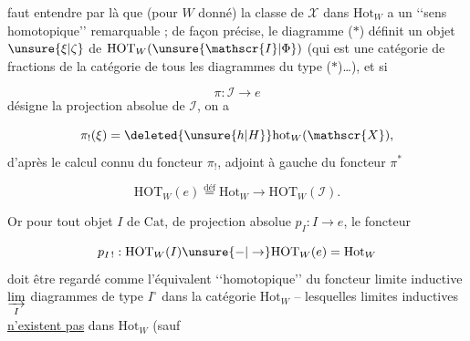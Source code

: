  faut entendre par là que (pour $W$  donné) la classe  de $\mathscr{X}$ dans $\mathrm{Hot}_W$ a un \lq\lq sens homotopique\rq\rq{} remarquable  ; de façon précise, le diagramme ($*$) définit un objet $\unsure{\xi|\zeta}$ de $\mathrm{HOT}_W(\unsure{\mathscr{I}|\Phi})$ (qui est une catégorie de fractions de la catégorie de tous les diagrammes du type ($*$)\ldots), et si \deleted{\unsure{$\xi$}}

\[
\pi:\mathscr{I}\longrightarrow e
\]
désigne la projection absolue de $\mathscr{I}$, on a

\[
\pi_!(\xi)=\deleted{\unsure{h|H}}\mathrm{hot}_W(\mathscr{X}),
\]
d'après le calcul connu du foncteur $\pi_!$, adjoint à gauche du foncteur $\pi^*$

\[
\mathrm{HOT}_W(e)\overset{\text{déf}}{=}\mathrm{Hot}_W\longrightarrow\mathrm{HOT}_W(\mathscr{I}).
\]


Or pour tout objet $I$ de $\mathrm{Cat}$, de projection absolue $p_I:I\to e$, le foncteur

\[
p_{I\,!}:\mathrm{HOT}_W(I)\unsure{-|\to}\mathrm{HOT}_W(e)=\mathrm{Hot}_W
\]
doit être regardé comme l'équivalent \lq\lq homotopique\rq\rq{} \unsure{,} du foncteur limite inductive $\underset{I}{\varinjlim}$  diagrammes de type $I^\circ$ dans la catégorie $\mathrm{Hot}_W$ -- lesquelles limites inductives \uline{n'existent pas} dans $\mathrm{Hot}_W$ (sauf
